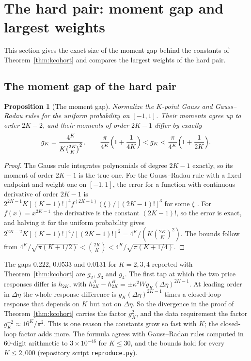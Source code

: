\documentclass[12pt]{article}
\newtheorem{proposition}[theorem]{Proposition}
\theoremstyle{definition}
\theoremstyle{remark}
\begin{document}
\section{The hard pair: moment gap and largest weights}\label{app:openres}

This section gives the exact size of the moment gap behind the constants of Theorem~\ref{thm:kcohort} and compares the largest weights of the hard pair.

\subsection{The moment gap of the hard pair}

\begin{proposition}[The moment gap]\label{prop:gap}
Normalize the $K$-point Gauss and Gauss--Radau rules for the uniform probability on $[-1,1]$. Their moments agree up to order $2K-2$, and their moments of order $2K-1$ differ by exactly
\[
g_K=\frac{4^K}{K\binom{2K}{K}^2},\qquad \frac{\pi}{4^K}\Bigl(1+\frac1{4K}\Bigr)<g_K<\frac{\pi}{4^K}\Bigl(1+\frac1{2K}\Bigr).
\]
\end{proposition}

\begin{proof}
The Gauss rule integrates polynomials of degree $2K-1$ exactly, so its moment of order $2K-1$ is the true one. For the Gauss--Radau rule with a fixed endpoint and weight one on $[-1,1]$, the error for a function with continuous derivative of order $2K-1$ is $2^{2K-1}K[(K-1)!]^4f^{(2K-1)}(\xi)/[(2K-1)!]^3$ for some $\xi$ \citep[25.4.31]{abramowitz1964}. For $f(x)=x^{2K-1}$ the derivative is the constant $(2K-1)!$, so the error is exact, and halving it for the uniform probability gives $2^{2K-2}K[(K-1)!]^4/[(2K-1)!]^2=4^K/(K\binom{2K}{K}^2)$. The bounds follow from $4^K/\sqrt{\pi(K+1/2)}<\binom{2K}{K}<4^K/\sqrt{\pi(K+1/4)}$.
\end{proof}

The gaps $0.222$, $0.0533$ and $0.0131$ for $K=2,3,4$ reported with Theorem~\ref{thm:kcohort} are $g_2$, $g_3$ and $g_4$. The first tap at which the two price responses differ is $h_{2K}$, with $h^A_{2K}-h^B_{2K}=\pm\kappa^2Wg_K(\Delta\eta)^{2K-1}$. At leading order in $\Delta\eta$ the whole response difference is $g_K(\Delta\eta)^{2K-1}$ times a closed-loop response that depends on $K$ but not on $\Delta\eta$. So the divergence in the proof of Theorem~\ref{thm:kcohort} carries the factor $g_K^2$, and the data requirement the factor $g_K^{-2}\approx16^K/\pi^2$. This is one reason the constants grow so fast with $K$; the closed-loop factor adds more. The formula agrees with Gauss--Radau rules computed in 60-digit arithmetic to $3\times10^{-46}$ for $K\le30$, and the bounds hold for every $K\le2{,}000$ (repository script \nolinkurl{reproduce.py}).
\end{document}

